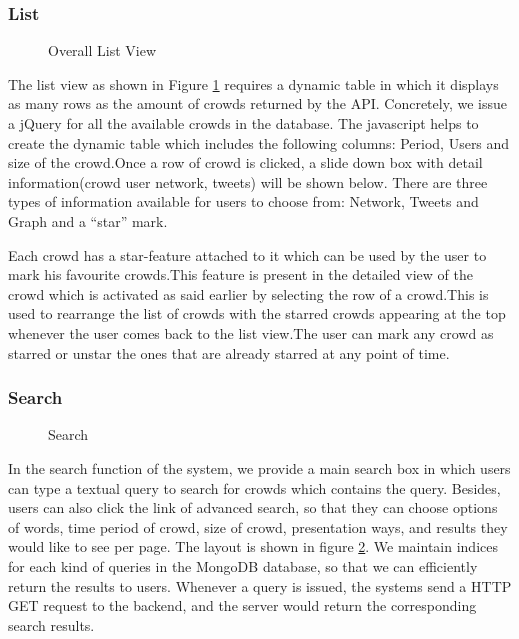 \documentclass{sig-alternate}
\begin{document}
\subsubsection{List}

\begin{figure}
\centering
{}
\caption{Overall List View}
\label{fig:ListView}
\end{figure}

The list view as shown in Figure \ref{fig:ListView} requires a dynamic table in which it displays as many rows as the amount of crowds returned by the API. Concretely, we issue a jQuery for all the available crowds in the database. The javascript helps to create the dynamic table which includes the following columns: Period, Users and size of the crowd.Once a row of crowd is clicked, a slide down box with detail information(crowd user network, tweets) will be shown below. There are three types of information available for users to choose from: Network, Tweets and Graph and a ``star'' mark. 

Each crowd has a star-feature attached to it which can be used by the user to mark his favourite crowds.This feature is present in the detailed view of the crowd which is activated as said earlier by selecting the row of a crowd.This is used to rearrange the list of crowds with the starred crowds appearing at the top whenever the user comes back to the list view.The user can mark any crowd as starred or unstar the ones that are already starred at any point of time. 



\subsubsection{Search}

\begin{figure}
\centering
{}
\caption{Search}
\label{fig:Search}
\end{figure}
In the search function of the system, we provide a main search box in which 
users can type a textual query to search for crowds which contains the query.
Besides, users can also click the link of advanced search, so that they can 
choose options of words, time period of crowd, size of crowd, presentation ways,
and results they would like to see per page. The layout is shown in figure \ref{fig:Search}. We maintain indices for each kind
of queries in the MongoDB database, so that we can efficiently return the results
to users. Whenever a query is issued, the systems send a HTTP GET request to the
backend, and the server would return the corresponding search results.
\end{document}
